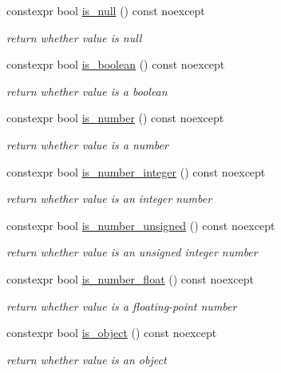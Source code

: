 \begin{DoxyCompactItemize}
constexpr bool \mbox{\hyperlink{classnlohmann_1_1basic__json_a8faa039ca82427ed29c486ffd00600c3}{is\+\_\+null}} () const noexcept
\begin{DoxyCompactList}\small\item\em return whether value is null \end{DoxyCompactList}\item 
constexpr bool \mbox{\hyperlink{classnlohmann_1_1basic__json_a943e8cb182d0f2365c76d64b42eaa6fd}{is\+\_\+boolean}} () const noexcept
\begin{DoxyCompactList}\small\item\em return whether value is a boolean \end{DoxyCompactList}\item 
constexpr bool \mbox{\hyperlink{classnlohmann_1_1basic__json_a2b9852390abb4b1ef5fac6984e2fc0f3}{is\+\_\+number}} () const noexcept
\begin{DoxyCompactList}\small\item\em return whether value is a number \end{DoxyCompactList}\item 
constexpr bool \mbox{\hyperlink{classnlohmann_1_1basic__json_abac8af76067f1e8fdca9052882c74428}{is\+\_\+number\+\_\+integer}} () const noexcept
\begin{DoxyCompactList}\small\item\em return whether value is an integer number \end{DoxyCompactList}\item 
constexpr bool \mbox{\hyperlink{classnlohmann_1_1basic__json_abc7378cba0613a78b9aad1c8e7044bb0}{is\+\_\+number\+\_\+unsigned}} () const noexcept
\begin{DoxyCompactList}\small\item\em return whether value is an unsigned integer number \end{DoxyCompactList}\item 
constexpr bool \mbox{\hyperlink{classnlohmann_1_1basic__json_a33b4bf898b857c962e798fc7f6e86e70}{is\+\_\+number\+\_\+float}} () const noexcept
\begin{DoxyCompactList}\small\item\em return whether value is a floating-\/point number \end{DoxyCompactList}\item 
constexpr bool \mbox{\hyperlink{classnlohmann_1_1basic__json_af8f511af124e82e4579f444b4175787c}{is\+\_\+object}} () const noexcept
\begin{DoxyCompactList}\small\item\em return whether value is an object \end{DoxyCompactList}\item 

\end{DoxyCompactItemize}
